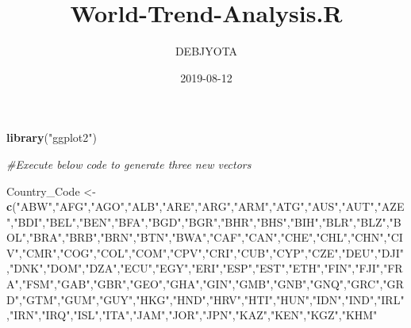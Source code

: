 \documentclass[]{article}
\title{World-Trend-Analysis.R}
\author{DEBJYOTA}
\date{2019-08-12}
\newenvironment{Shaded}{\begin{snugshade}}{\end{snugshade}}
\newcommand{\CommentTok}[1]{\textcolor[rgb]{0.56,0.35,0.01}{\textit{#1}}}
\newcommand{\KeywordTok}[1]{\textcolor[rgb]{0.13,0.29,0.53}{\textbf{#1}}}
\newcommand{\NormalTok}[1]{#1}
\newcommand{\StringTok}[1]{\textcolor[rgb]{0.31,0.60,0.02}{#1}}
\begin{document}
\maketitle

\begin{Shaded}
\begin{Highlighting}[]
\KeywordTok{library}\NormalTok{(}\StringTok{"ggplot2"}\NormalTok{)}

\CommentTok{#Execute below code to generate three new vectors}

\NormalTok{Country_Code <-}\StringTok{ }\KeywordTok{c}\NormalTok{(}\StringTok{"ABW"}\NormalTok{,}\StringTok{"AFG"}\NormalTok{,}\StringTok{"AGO"}\NormalTok{,}\StringTok{"ALB"}\NormalTok{,}\StringTok{"ARE"}\NormalTok{,}\StringTok{"ARG"}\NormalTok{,}\StringTok{"ARM"}\NormalTok{,}\StringTok{"ATG"}\NormalTok{,}\StringTok{"AUS"}\NormalTok{,}\StringTok{"AUT"}\NormalTok{,}\StringTok{"AZE"}\NormalTok{,}\StringTok{"BDI"}\NormalTok{,}\StringTok{"BEL"}\NormalTok{,}\StringTok{"BEN"}\NormalTok{,}\StringTok{"BFA"}\NormalTok{,}\StringTok{"BGD"}\NormalTok{,}\StringTok{"BGR"}\NormalTok{,}\StringTok{"BHR"}\NormalTok{,}\StringTok{"BHS"}\NormalTok{,}\StringTok{"BIH"}\NormalTok{,}\StringTok{"BLR"}\NormalTok{,}\StringTok{"BLZ"}\NormalTok{,}\StringTok{"BOL"}\NormalTok{,}\StringTok{"BRA"}\NormalTok{,}\StringTok{"BRB"}\NormalTok{,}\StringTok{"BRN"}\NormalTok{,}\StringTok{"BTN"}\NormalTok{,}\StringTok{"BWA"}\NormalTok{,}\StringTok{"CAF"}\NormalTok{,}\StringTok{"CAN"}\NormalTok{,}\StringTok{"CHE"}\NormalTok{,}\StringTok{"CHL"}\NormalTok{,}\StringTok{"CHN"}\NormalTok{,}\StringTok{"CIV"}\NormalTok{,}\StringTok{"CMR"}\NormalTok{,}\StringTok{"COG"}\NormalTok{,}\StringTok{"COL"}\NormalTok{,}\StringTok{"COM"}\NormalTok{,}\StringTok{"CPV"}\NormalTok{,}\StringTok{"CRI"}\NormalTok{,}\StringTok{"CUB"}\NormalTok{,}\StringTok{"CYP"}\NormalTok{,}\StringTok{"CZE"}\NormalTok{,}\StringTok{"DEU"}\NormalTok{,}\StringTok{"DJI"}\NormalTok{,}\StringTok{"DNK"}\NormalTok{,}\StringTok{"DOM"}\NormalTok{,}\StringTok{"DZA"}\NormalTok{,}\StringTok{"ECU"}\NormalTok{,}\StringTok{"EGY"}\NormalTok{,}\StringTok{"ERI"}\NormalTok{,}\StringTok{"ESP"}\NormalTok{,}\StringTok{"EST"}\NormalTok{,}\StringTok{"ETH"}\NormalTok{,}\StringTok{"FIN"}\NormalTok{,}\StringTok{"FJI"}\NormalTok{,}\StringTok{"FRA"}\NormalTok{,}\StringTok{"FSM"}\NormalTok{,}\StringTok{"GAB"}\NormalTok{,}\StringTok{"GBR"}\NormalTok{,}\StringTok{"GEO"}\NormalTok{,}\StringTok{"GHA"}\NormalTok{,}\StringTok{"GIN"}\NormalTok{,}\StringTok{"GMB"}\NormalTok{,}\StringTok{"GNB"}\NormalTok{,}\StringTok{"GNQ"}\NormalTok{,}\StringTok{"GRC"}\NormalTok{,}\StringTok{"GRD"}\NormalTok{,}\StringTok{"GTM"}\NormalTok{,}\StringTok{"GUM"}\NormalTok{,}\StringTok{"GUY"}\NormalTok{,}\StringTok{"HKG"}\NormalTok{,}\StringTok{"HND"}\NormalTok{,}\StringTok{"HRV"}\NormalTok{,}\StringTok{"HTI"}\NormalTok{,}\StringTok{"HUN"}\NormalTok{,}\StringTok{"IDN"}\NormalTok{,}\StringTok{"IND"}\NormalTok{,}\StringTok{"IRL"}\NormalTok{,}\StringTok{"IRN"}\NormalTok{,}\StringTok{"IRQ"}\NormalTok{,}\StringTok{"ISL"}\NormalTok{,}\StringTok{"ITA"}\NormalTok{,}\StringTok{"JAM"}\NormalTok{,}\StringTok{"JOR"}\NormalTok{,}\StringTok{"JPN"}\NormalTok{,}\StringTok{"KAZ"}\NormalTok{,}\StringTok{"KEN"}\NormalTok{,}\StringTok{"KGZ"}\NormalTok{,}\StringTok{"KHM"}\
\end{Highlighting}
\end{Shaded}
\end{document}
